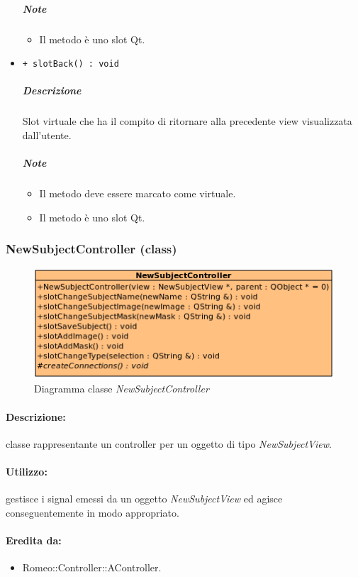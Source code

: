 \begin{itemize}
			\subparagraph{Note}
			\begin{itemize}
				\item Il metodo è uno slot\g{} Qt\g{}.
			\end{itemize}
			\item \color{blue} \verb!+ slotBack() : void!
			\color{black}
			\subparagraph{Descrizione} Slot\g{}  virtuale che ha il compito di ritornare alla precedente view visualizzata dall'utente.
			\subparagraph{Note}
			\begin{itemize}
				\item Il metodo deve essere marcato come virtuale.
				\item Il metodo è uno slot\g{} Qt\g{}.
			\end{itemize}
		\end{itemize}
		\pagebreak
	\subsubsection{NewSubjectController (class)}
	\begin{figure}[!h]
		\centering
		\includegraphics[width=0.7\linewidth]{./Content/Immagini/controller/NewSubjectController.png}
		\caption{Diagramma classe \textsl{NewSubjectController}}
	\end{figure}
	\paragraph{Descrizione:} classe rappresentante un controller per un oggetto di tipo \textsl{NewSubjectView}.
	\paragraph{Utilizzo:} gestisce i signal\g{} emessi da un oggetto \textsl{NewSubjectView} ed agisce conseguentemente in modo appropriato.
	\paragraph{Eredita da:}
		\begin{itemize}
			\item Romeo::Controller::AController.
		\end{itemize}
